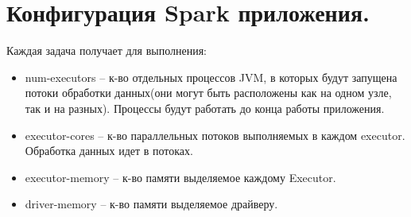 \section{Конфигурация Spark приложения.}

Каждая задача получает для выполнения:
\begin{itemize}
    \item num-executors – к-во отдельных процессов JVM, в которых будут
    запущена потоки обработки данных(они могут быть расположены
    как на одном узле, так и на разных). Процессы будут работать до
    конца работы приложения.
    \item executor-cores – к-во параллельных потоков выполняемых в
    каждом executor. Обработка данных идет в потоках.
    \item executor-memory – к-во памяти выделяемое каждому Executor.
    \item driver-memory – к-во памяти выделяемое драйверу.
\end{itemize}

